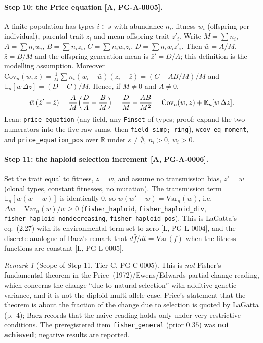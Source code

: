 \documentclass[11pt]{article}
\theoremstyle{remark}
\newtheorem{remark}[theorem]{Remark}
\newcommand{\R}{\mathbb{R}}
\newcommand{\tier}[1]{\textsf{[#1]}}
\newcommand{\lean}[1]{\texttt{#1}}
\begin{document}
\paragraph{Step 10: the Price equation \tier{A, PG-A-0005}.} A finite population has types $i\in s$ with abundance
$n_i$, fitness $w_i$ (offspring per individual), parental trait $z_i$ and mean offspring trait $z'_i$. Write
$M=\sum n_i$, $A=\sum n_iw_i$, $B=\sum n_iz_i$, $C=\sum n_iw_iz_i$, $D=\sum n_iw_iz'_i$. Then
$\bar w=A/M$, $\bar z=B/M$ and the offspring-generation mean is $\bar z'=D/A$; this definition is the modelling
assumption. Moreover $\mathrm{Cov}_n(w,z)=\frac1M\sum n_i(w_i-\bar w)(z_i-\bar z)=(C-AB/M)/M$ and
$\mathbb E_n[w\,\Delta z]=(D-C)/M$. Hence, if $M\ne0$ and $A\ne0$,
\[
\bar w\,(\bar z'-\bar z)=\frac AM\Bigl(\frac DA-\frac BM\Bigr)=\frac DM-\frac{AB}{M^2}
=\mathrm{Cov}_n(w,z)+\mathbb E_n[w\,\Delta z].
\]
Lean: \lean{price\_equation} (any field, any \lean{Finset} of types; proof: expand the two numerators into the five raw
sums, then \lean{field\_simp; ring}), \lean{wcov\_eq\_moment}, and \lean{price\_equation\_pos} over $\R$ under
$s\ne\emptyset$, $n_i>0$, $w_i>0$.

\paragraph{Step 11: the haploid selection increment \tier{A, PG-A-0006}.} Set the trait equal to fitness, $z=w$, and assume
no transmission bias, $z'=w$ (clonal types, constant fitnesses, no mutation). The transmission term
$\mathbb E_n[w(w-w)]$ is identically $0$, so $\bar w(\bar w'-\bar w)=\mathrm{Var}_n(w)$, i.e.
$\Delta\bar w=\mathrm{Var}_n(w)/\bar w\ge0$ (\lean{fisher\_haploid}, \lean{fisher\_haploid\_div},
\lean{fisher\_haploid\_nondecreasing}, \lean{fisher\_haploid\_pos}). This is LaGatta's eq.~(2.27)
with its environmental term set to zero \tier{L, PG-L-0004}, and the discrete analogue of Baez's remark that
$d\bar f/dt=\mathrm{Var}(f)$ when the fitness functions are constant \tier{L, PG-L-0005}.

\begin{remark}[Scope of Step 11, Tier C, PG-C-0005]
This is \emph{not} Fisher's fundamental theorem in the Price~(1972)/Ewens/Edwards partial-change reading, which concerns
the change ``due to natural selection'' with additive genetic variance, and it is not the diploid multi-allele case. Price's
statement that the theorem is about the fraction of the change due to selection is quoted by LaGatta (p.~4); Baez records that the naive
reading holds only under very restrictive conditions. The preregistered item \texttt{fisher\_general} (prior $0.35$) was
\textbf{not achieved}; negative results are reported.
\end{remark}
\end{document}
